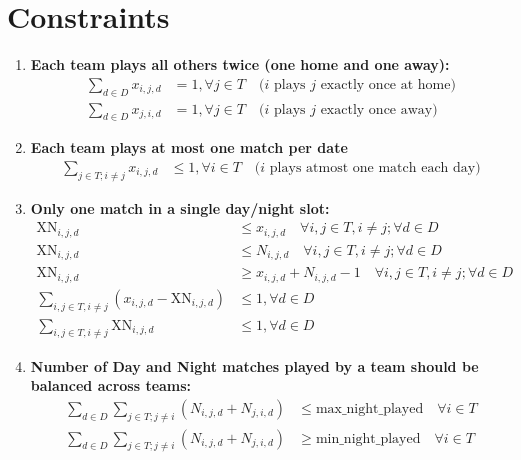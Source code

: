 \documentclass[a4paper, 12pt]{article}
\begin{document}
\section*{Constraints}
\begin{enumerate}
    \item \textbf{Each team plays all others twice (one home and one away):}
    \begin{align*}
        \sum_{d \in D} x_{i,j,d} &= 1 , \forall j \in T \quad \text{($i$ plays $j$ exactly once at home)}\\
        \sum_{d \in D} x_{j,i,d} &= 1 , \forall j \in T \quad \text{($i$ plays $j$ exactly once away)}
    \end{align*}

    \item \textbf{Each team plays at most one match per date}
    \begin{align*}
        \sum_{j \in T; i \neq j} x_{i,j,d} &\leq 1, \forall i \in T \quad \text{($i$ plays atmost one match each day)}
    \end{align*}

    \item \textbf{Only one match in a single day/night slot:}
    \begin{align*}
        \text{XN}_{i,j,d} &\leq x_{i,j,d} \quad \forall i,j \in T, i \neq j; \forall d \in D\\
        \text{XN}_{i,j,d} &\leq N_{i,j,d} \quad \forall i,j \in T, i \neq j; \forall d \in D\\
        \text{XN}_{i,j,d} &\geq x_{i,j,d} + N_{i,j,d} - 1 \quad \forall i,j \in T, i \neq j; \forall d \in D\\
        \sum_{i,j \in T, i \neq j} (x_{i,j,d} -\text{XN}_{i,j,d}) &\leq 1, \forall d \in D \\
        \sum_{i,j \in T, i \neq j} \text{XN}_{i,j,d} &\leq 1, \forall d \in D 
    \end{align*}

    \item \textbf{Number of Day and Night matches played by a team should be balanced across teams:}
    \begin{align*}
        \sum_{d \in D} \sum_{j \in T; j \neq i} (N_{i,j,d} + N_{j,i,d}) &\leq \text{max\_night\_played} \quad \forall i \in T\\
        \sum_{d \in D} \sum_{j \in T; j \neq i} (N_{i,j,d} + N_{j,i,d})
        &\geq \text{min\_night\_played} \quad \forall i \in T
    \end{align*}


\end{enumerate}
\end{document}
